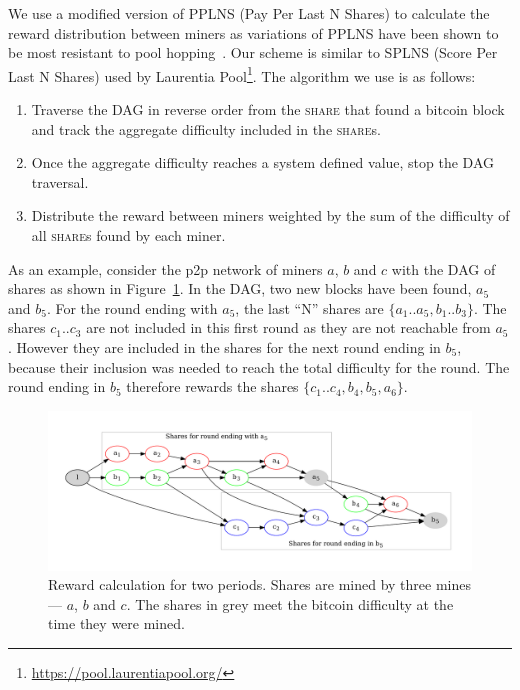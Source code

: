 \documentclass{article}
\begin{document}
We use a modified version of PPLNS (Pay Per Last N Shares) to
calculate the reward distribution between miners as variations of
PPLNS have been shown to be most resistant to pool
hopping~\cite{rosenfeld2011analysis}. Our scheme is similar to SPLNS
(Score Per Last N Shares) used by Laurentia
Pool\footnote{\url{https://pool.laurentiapool.org/}}. The algorithm we
use is as follows:

\begin{enumerate}
\item Traverse the DAG in reverse order from the \textsc{share} that
  found a bitcoin block and track the aggregate difficulty included in
  the \textsc{share}s.
\item Once the aggregate difficulty reaches a system defined value,
  stop the DAG traversal.
\item Distribute the reward between miners weighted by the sum of the
  difficulty of all \textsc{share}s found by each miner.
\end{enumerate}

As an example, consider the p2p network of miners $a$, $b$ and $c$
with the DAG of shares as shown in
Figure~\ref{fig:reward-calculation}. In the DAG, two new blocks have
been found, $a_5$ and $b_5$. For the round ending with $a_5$, the last
``N'' shares are $\{a_1..a_5, b_1..b_3\}$. The shares $c_1..c_3$ are
not included in this first round as they are not reachable from
$a_5$. However they are included in the shares for the next round
ending in $b_5$, because their inclusion was needed to reach the total
difficulty for the round. The round ending in $b_5$ therefore rewards
the shares $\{c_1..c_4, b_4, b_5, a_6\}$.

\begin{figure}
  \begin{center}
    \includegraphics[width=1.0\textwidth]{reward-calculation}
    \caption{Reward calculation for two periods. Shares are mined by
      three mines --- $a$, $b$ and $c$. The shares in grey meet the
      bitcoin difficulty at the time they were
      mined.}\label{fig:reward-calculation}
  \end{center}
\end{figure}
\end{document}
